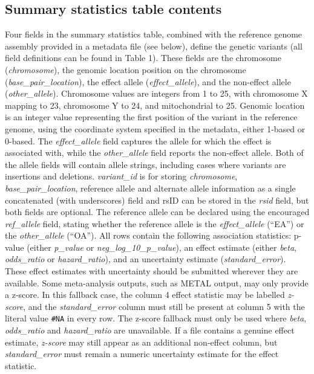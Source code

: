 \documentclass[11pt]{article}
\begin{document}
\subsection{Summary statistics table contents}
Four fields in the summary statistics table, combined with the reference genome assembly provided in a metadata file (see below), define the genetic variants (all field definitions can be found in Table 1). These fields are the chromosome (\textit{chromosome}), the genomic location position on the chromosome (\textit{base\_pair\_location}), the effect allele (\textit{effect\_allele}), and the non-effect allele (\textit{other\_allele}). Chromosome values are integers from 1 to 25, with chromosome X mapping to 23, chromosome Y to 24, and mitochondrial to 25. Genomic location is an integer value representing the first position of the variant in the reference genome, using the coordinate system specified in the metadata, either 1-based or 0-based. The \textit{effect\_allele} field captures the allele for which the effect is associated with, while the \textit{other\_allele} field reports the non-effect allele. Both of the allele fields will contain allele strings, including cases where variants are insertions and deletions. \textit{variant\_id} is for storing \textit{chromosome}, \textit{base\_pair\_location}, reference allele and alternate allele information as a single concatenated (with underscores) field and rsID can be stored in the \textit{rsid} field, but both fields are optional. The reference allele can be declared using the encouraged \textit{ref\_allele} field, stating whether the reference allele is the \textit{effect\_allele} (``EA'') or the \textit{other\_allele} (``OA'').
All rows contain the following association statistics: p-value (either \textit{p\_value} or \textit{neg\_log\_10\_p\_value}), an effect estimate (either \textit{beta}, \textit{odds\_ratio} or \textit{hazard\_ratio}), and an uncertainty estimate (\textit{standard\_error}). These effect estimates with uncertainty should be submitted wherever they are available. Some meta-analysis outputs, such as METAL output, may only provide a z-score. In this fallback case, the column 4 effect statistic may be labelled \textit{z-score}, and the \textit{standard\_error} column must still be present at column 5 with the literal value \texttt{\#NA} in every row. The z-score fallback must only be used where \textit{beta}, \textit{odds\_ratio} and \textit{hazard\_ratio} are unavailable. If a file contains a genuine effect estimate, \textit{z-score} may still appear as an additional non-effect column, but \textit{standard\_error} must remain a numeric uncertainty estimate for the effect statistic.
\end{document}
